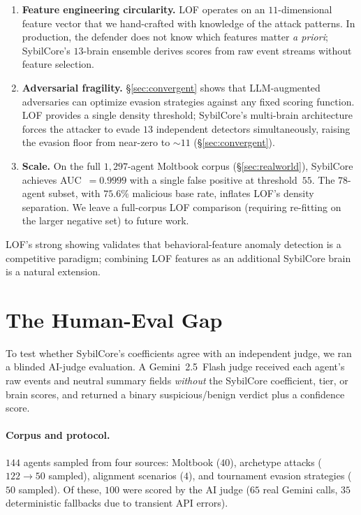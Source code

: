 \documentclass{article}
\begin{document}
\begin{enumerate}[leftmargin=*,nosep]
\item \textbf{Feature engineering circularity.} LOF operates on an
  $11$-dimensional feature vector that we hand-crafted with knowledge
  of the attack patterns. In production, the defender does not know
  which features matter \emph{a priori}; SybilCore's $13$-brain
  ensemble derives scores from raw event streams without feature
  selection.
\item \textbf{Adversarial fragility.} \S\ref{sec:convergent} shows
  that LLM-augmented adversaries can optimize evasion strategies
  against any fixed scoring function. LOF provides a single density
  threshold; SybilCore's multi-brain architecture forces the attacker
  to evade $13$ independent detectors simultaneously, raising the
  evasion floor from near-zero to $\sim\!11$ (\S\ref{sec:convergent}).
\item \textbf{Scale.} On the full $1{,}297$-agent Moltbook corpus
  (\S\ref{sec:realworld}), SybilCore achieves
  AUC~$= 0.9999$ with a single false positive at threshold~$55$.
  The $78$-agent subset, with $75.6\%$ malicious base rate, inflates
  LOF's density separation. We leave a full-corpus LOF comparison
  (requiring re-fitting on the larger negative set) to future work.
\end{enumerate}

\noindent LOF's strong showing validates that behavioral-feature
anomaly detection is a competitive paradigm; combining LOF features
as an additional SybilCore brain is a natural extension.



\section{The Human-Eval Gap}
\label{sec:humaneval}

To test whether SybilCore's coefficients agree with an independent
judge, we ran a blinded AI-judge evaluation. A Gemini~2.5~Flash judge
received each agent's raw events and neutral summary fields
\emph{without} the SybilCore coefficient, tier, or brain scores, and
returned a binary suspicious/benign verdict plus a confidence score.

\paragraph{Corpus and protocol.}
$144$ agents sampled from four sources: Moltbook ($40$), archetype
attacks ($122 \to 50$ sampled), alignment scenarios ($4$), and
tournament evasion strategies ($50$ sampled). Of these, $100$ were
scored by the AI judge ($65$ real Gemini calls, $35$ deterministic
fallbacks due to transient API errors).
\end{document}
